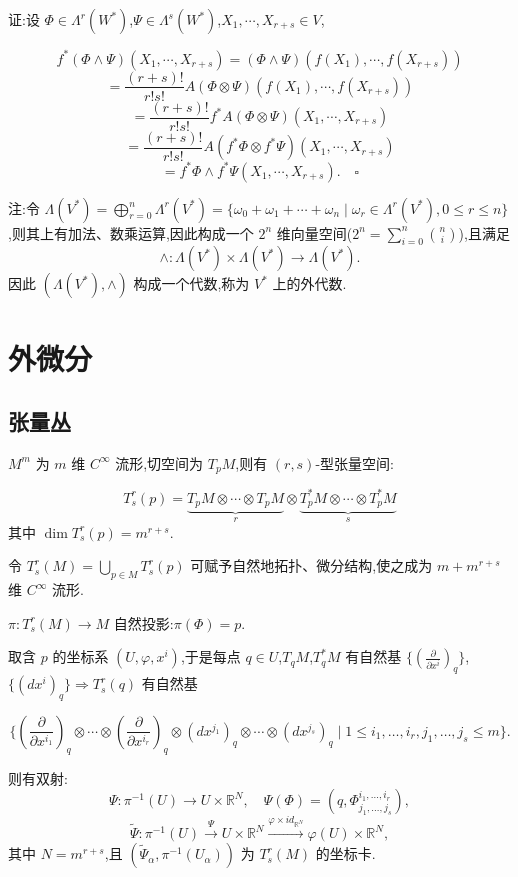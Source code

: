 证:设 $\Phi \in \Lambda^r(W^*)$,$\Psi \in \Lambda^s(W^*)$,$X_1, \cdots, X_{r+s} \in V$,

\[
f^*(\Phi \land \Psi)(X_1, \cdots, X_{r+s}) = (\Phi \land \Psi)(f(X_1), \cdots, f(X_{r+s}))
\]
\[
= \frac{(r + s)!}{r!s!} A(\Phi \otimes \Psi)(f(X_1), \cdots, f(X_{r+s}))
\]
\[
= \frac{(r + s)!}{r!s!} f^*A(\Phi \otimes \Psi)(X_1, \cdots, X_{r+s})
\]
\[
= \frac{(r + s)!}{r!s!} A(f^*\Phi \otimes f^*\Psi)(X_1, \cdots, X_{r+s})
\]
\[
= f^*\Phi \land f^*\Psi(X_1, \cdots, X_{r+s}). \quad \square
\]

注:令 $\Lambda(V^*) = \bigoplus_{r=0}^n \Lambda^r(V^*) = \{ \omega_0 + \omega_1 + \cdots + \omega_n \mid \omega_r \in \Lambda^r(V^*), 0 \leq r \leq n \}$,则其上有加法、数乘运算,因此构成一个 $2^n$ 维向量空间($2^n = \sum_{i=0}^n \binom{n}{i}$),且满足
\[
\wedge : \Lambda(V^*) \times \Lambda(V^*) \rightarrow \Lambda(V^*).
\]
因此 $(\Lambda(V^*), \wedge)$ 构成一个代数,称为 $V^*$ 上的外代数.

\section{外微分}

\subsection{张量丛}

$M^m$ 为 $m$ 维 $C^\infty$ 流形,切空间为 $T_pM$,则有 $(r,s)$-型张量空间:

\[
T_s^r(p) = \underbrace{T_pM \otimes \cdots \otimes T_pM}_{r} \otimes \underbrace{T_p^*M \otimes \cdots \otimes T_p^*M}_{s}
\]
其中 $\dim T_s^r(p) = m^{r+s}$.

令 $T_s^r(M) = \bigcup_{p \in M} T_s^r(p)$ 可赋予自然地拓扑、微分结构,使之成为 $m + m^{r+s}$ 维 $C^\infty$ 流形.

$\pi : T_s^r(M) \to M$ 自然投影:$\pi(\Phi) = p$.

取含 $p$ 的坐标系 $(U, \varphi, x^i)$,于是每点 $q \in U$,$T_qM$,$T_q^*M$ 有自然基 $\{(\frac{\partial}{\partial x^i})_q\}$,$\{(dx^i)_q\} \Rightarrow T_s^r(q)$ 有自然基

\[
\{ (\frac{\partial}{\partial x^{i_1}})_q \otimes \cdots \otimes (\frac{\partial}{\partial x^{i_r}})_q \otimes (dx^{j_1})_q \otimes \cdots \otimes (dx^{j_s})_q \mid 1 \leq i_1, \ldots, i_r, j_1, \ldots, j_s \leq m \}.
\]

则有双射:
\[
\Psi : \pi^{-1}(U) \to U \times \mathbb{R}^N, \quad \Psi(\Phi) = (q, \Phi^{i_1,\ldots,i_r}_{j_1,\ldots,j_s}),
\]
\[
\tilde{\Psi} : \pi^{-1}(U) \xrightarrow{\Psi} U \times \mathbb{R}^N \xrightarrow{\varphi \times id_{\mathbb{R}^N}} \varphi(U) \times \mathbb{R}^N,
\]
其中 $N = m^{r+s}$,且 $(\tilde{\Psi}_\alpha, \pi^{-1}(U_\alpha))$ 为 $T_s^r(M)$ 的坐标卡.

